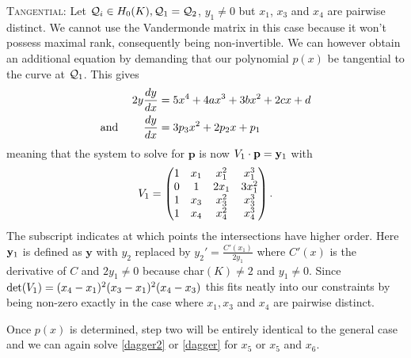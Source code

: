 \documentclass[english,11pt,a4paper]{article}
\begin{document}
\setcounter{case}{1}
\begin{case}
	{\scshape Tangential:} Let $\mathcal{Q}_i\in H_0(K), \mathcal{Q}_1 = \mathcal{Q}_2$, $y_1 \neq 0$ but $x_1$, $x_3$ and $x_4$ are pairwise distinct. We cannot use the Vandermonde matrix in this case because it won't possess maximal rank, consequently being non-invertible. We can however obtain an additional equation by demanding that our polynomial $p(x)$ be tangential to the curve at $\mathcal{Q}_1$. This gives
	\begin{align*}
	  2 y \frac{dy}{dx} &= 5  x^4 + 4 a x^3 + 3 b x^2 + 2 c x + d \\
	  \text{and\hspace{8mm}} \frac{dy}{dx} &= 3 p_3 x^2 + 2 p_2 x + p_1
	\end{align*}
	meaning that the system to solve for $\mathbf{p}$ is now $V_1 \cdot \mathbf{p} = \mathbf{y}_1$ with
	\begin{align*}V_1=
		\begin{pmatrix}
			1 & x_1 & x_1^2 & x_1^3\\
			0 & 1 & 2 x_1 & 3 x_1^2\\
			1 & x_3 & x_3^2 & x_3^3\\
			1 & x_4 & x_4^2 & x_4^3\\
		\end{pmatrix}.
	\end{align*}
	The subscript indicates at which points the intersections have higher order.
	Here $\mathbf{y}_1$ is defined as $\mathbf{y}$ with $y_2$ replaced by $y_2'=\frac{C'(x_1)}{2 y_1}$ where $C'(x)$ is the derivative of $C$ and $2y_1 \neq 0$ because char$(K) \neq 2$ and $y_1\neq 0$. Since $\det(V_1) = (x_4-x_1)^2(x_3-x_1)^2(x_4-x_3)$ this fits neatly into our constraints by being non-zero exactly in the case where $x_1, x_3$ and $x_4$ are pairwise distinct.

	Once $p(x)$ is determined, step two will be entirely identical to the general case and we can again solve \eqref{dagger2} or \eqref{dagger} for $x_5$ or $x_5$ and $x_6$.

\end{case}
\end{document}

